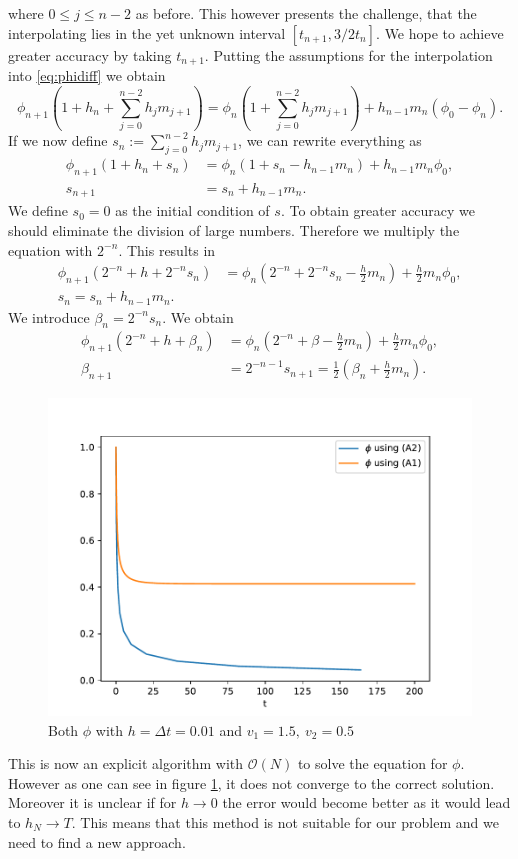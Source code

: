 \documentclass[12pt,a4paper,twoside, open=right]{scrreprt}
\theoremstyle{definition}
\theoremstyle{plain}
\begin{document}
where $0\le j\le n-2$ as before. This however presents the challenge, that the interpolating lies in the yet unknown interval $[t_{n+1},3/2t_{n}]$. We hope to achieve greater accuracy by taking $t_{n+1}$. Putting the assumptions for the interpolation into \eqref{eq:phidiff} we obtain
\begin{equation}
    \phi_{n+1}(1 + h_n + \sum_{j=0}^{n-2}h_jm_{j+1})=\phi_n(1+\sum_{j=0}^{n-2}h_jm_{j+1})+h_{n-1}m_n(\phi_0-\phi_n).
\end{equation}
If we now define $s_n:=\sum_{j=0}^{n-2}h_jm_{j+1}$, we can rewrite everything as
\begin{align}
    \phi_{n+1}(1+h_n+s_n)&=\phi_n(1+s_n-h_{n-1}m_n)+h_{n-1}m_n\phi_0,\\
    s_{n+1}&=s_n+h_{n-1}m_n.
\end{align}
We define $s_0=0$ as the initial condition of $s$. To obtain greater accuracy we should eliminate the division of large numbers. Therefore we multiply the equation with $2^{-n}$. This results in
\begin{align}
    \phi_{n+1}(2^{-n}+h+2^{-n}s_n) &= \phi_n(2^{-n}+2^{-n}s_n-\frac{h}{2}m_n)+\frac{h}{2}m_n\phi_0,\\
    s_n=s_n+h_{n-1}m_n.
\end{align}
We introduce $\beta_n=2^{-n}s_n$. We obtain
\begin{align}
     \phi_{n+1}(2^{-n}+h+\beta_n) &= \phi_n(2^{-n}+\beta-\frac{h}{2}m_n)+\frac{h}{2}m_n\phi_0,\\
     \beta_{n+1} &= 2^{-n-1}s_{n+1}=\frac{1}{2}(\beta_n+\frac{h}{2}m_n) .
\end{align}
\begin{figure}[htb]
    \centering
    \includegraphics[width=\textwidth]{Phidiff}
    \caption{Both $\phi$ with $h=\Delta t=0.01$ and $v_1=1.5,~v_2=0.5$}
    \label{fig:phifalse}
\end{figure}
This is now an explicit algorithm with $\mathcal{O}(N)$ to solve the equation for $\phi$. However as one can see in figure \ref{fig:phifalse}, it does not converge to the correct solution. Moreover it is unclear if for $h\to 0$ the error would become better as it would lead to $h_N\to T$. This means that this method is not suitable for our problem and we need to find a new approach.
\end{document}
